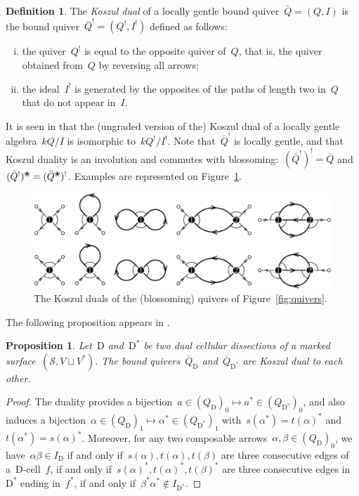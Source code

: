 \documentclass{amsart}
\newtheorem{proposition}[theorem]{Proposition}
\theoremstyle{definition}
\newtheorem{definition}[theorem]{Definition}
\newcommand{\fref}[1]{Figure~\ref{#1}} %
\newcommand{\darkblue}{\color{darkblue}} %
\newcommand{\defn}[1]{\textsl{\darkblue #1}} %
\newcommand{\blossom}{^\text{\ding{96}}} %
\newcommand{\surface}{\mathcal{S}} %
\newcommand{\dual}{^*} %
\newcommand{\dissection}{\mathrm{D}} %
\newcommand{\koszul}{^!} %
\begin{document}
\begin{definition}
\label{defi:koszulDual}
The \defn{Koszul dual} of a locally gentle bound quiver~$\bar Q = (Q,I)$ is the bound quiver~$\bar Q\koszul = (Q\koszul, I\koszul)$ defined as follows:
\begin{enumerate}[(i)]
\item the quiver~$Q\koszul$ is equal to the opposite quiver of~$Q$, that is, the quiver obtained from~$Q$ by reversing all arrows;
\item the ideal~$I\koszul$ is generated by the opposites of the paths of length two in~$Q$ that do not appear in~$I$.
\end{enumerate}
\end{definition}
It is seen in \cite{BessenrodtHolm} that the (ungraded version of the) Koszul dual of a locally gentle algebra~$kQ/I$ is isomorphic to~$kQ\koszul/I\koszul$.
Note that~$\bar Q\koszul$ is locally gentle, and that Koszul duality is an involution and commutes with blossoming:~$(\bar Q\koszul)\koszul = \bar Q$ and~$(\bar Q\koszul)\blossom = (\bar Q\blossom)\koszul$.
Examples are represented on \fref{fig:koszulQuivers}.

\begin{figure}[t]
	\capstart
	\centerline{\includegraphics[scale=.6]{koszulQuivers}}
	\caption{The Koszul duals of the (blossoming) quivers of \fref{fig:quivers}.}
	\label{fig:koszulQuivers}
\end{figure}

The following proposition appears in \cite[Proposition 1.25]{OpperPlamondonSchroll}.  

\begin{proposition}
\label{prop:dualityKoszul1}
Let~$\dissection$ and~$\dissection\dual$ be two dual cellular dissections of a marked surface~$(\surface, V\sqcup V\dual)$.
The bound quivers~$\bar Q_{\dissection}$ and~$\bar Q_{\dissection\dual}$ are Koszul dual to each other.
\end{proposition}

\begin{proof}
The duality provides a bijection~$a\in (Q_\dissection)_0\mapsto a\dual\in (Q_{\dissection\dual})_0$, and also induces a bijection~${\alpha \in (Q_\dissection)_1 \mapsto \alpha\dual \in (Q_{\dissection\dual})_1}$ with~$s(\alpha\dual) = t(\alpha)\dual$ and~$t(\alpha\dual) = s(\alpha)\dual$.
Moreover, for any two composable arrows~$\alpha,\beta\in(Q_\dissection)_0$, we have~$\alpha\beta\in I_\dissection$ if and only if~$s(\alpha),t(\alpha),t(\beta)$ are three consecutive edges of a~$\dissection$-cell~$f$, if and only if~$s(\alpha)\dual,t(\alpha)\dual,t(\beta)\dual$ are three consecutive edges in~$\dissection\dual$ ending in~$f\dual$, if and only if~$\beta\dual\alpha\dual\notin I_{\dissection\dual}$.
\end{proof}
\end{document}
